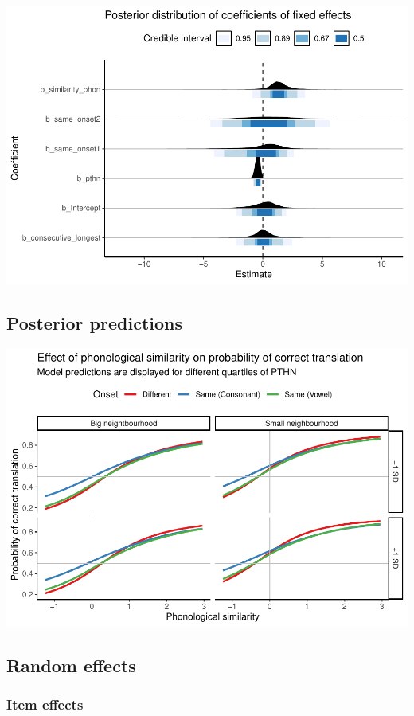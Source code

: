 \documentclass[
  english,
  man]{apa6}
\begin{document}
\includegraphics{te_manuscript_files/figure-latex/posterior_draws-1.pdf}

\hypertarget{posterior-predictions}{%
\subsection{Posterior predictions}\label{posterior-predictions}}

\includegraphics{te_manuscript_files/figure-latex/posterior_predictions-1.pdf}

\hypertarget{random-effects}{%
\subsection{Random effects}\label{random-effects}}

\hypertarget{item-effects}{%
\subsubsection{Item effects}\label{item-effects}}
\end{document}
